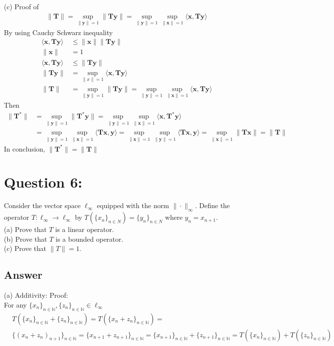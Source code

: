 \documentclass[a4paper,12pt]{article}
\newcommand{\N}{\mathbb{N}}
\begin{document}
\vspace{1cm}
\noindent
(c)
Proof of 
\begin{align*}
    \|\bm{T}\| = \sup_{\|\bm{y}\| = 1}\|\bm{T}\bm{y}\| = \sup_{\|\bm{y}\| = 1}\sup_{\|\bm{x}\| = 1}\langle \bm{x}, \bm{T}\bm{y} \rangle
\end{align*}
By using Cauchy Schwarz inequality
\begin{align*}
    \langle \bm{x}, \bm{T}\bm{y} \rangle &\leq \|\bm{x}\|\|\bm{T}\bm{y}\| \\
    \|\bm{x}\| &= 1 \\
    \langle \bm{x}, \bm{T}\bm{y} \rangle &\leq \|\bm{T}\bm{y}\| \\
    \|\bm{T}\bm{y}\| &= \sup_{\|x\| = 1} \langle \bm{x}, \bm{T}\bm{y} \rangle \\
    \|\bm{T}\| &= \sup_{\|\bm{y}\| = 1}\|\bm{T}\bm{y}\| = \sup_{\|\bm{y}\| = 1}\sup_{\|\bm{x}\| = 1}\langle \bm{x}, \bm{T}\bm{y} \rangle
\end{align*}
Then
\begin{align*}
    \|\bm{T}^*\| &= \sup_{\|\bm{y}\|=1} \|\bm{T}^* \bm{y}\| = \sup_{\|\bm{y}\|=1}  \sup_{\|\bm{x}\|=1}\langle \bm{x}, \bm{T}^*\bm{y}\rangle \\
    &= \sup_{\|\bm{y}\| = 1} \sup_{ \|\bm{x}\| = 1} \langle \bm{T}\bm{x}, \bm{y} \rangle = \sup_{\|\bm{x}\| = 1} \sup_{ \|\bm{y}\| = 1} \langle \bm{T}\bm{x}, \bm{y} \rangle = \sup_{\|\bm{x}\|=1}\|\bm{T}\bm{x}\| = \|\bm{T}\|
\end{align*}
In conclusion, \(\|\bm{T}^*\| = \|\bm{T}\|\)

\section*{Question 6:}
Consider the vector space \(\ell_{\infty}\) equipped with the norm \(\|\cdot\|_{\infty}\). Define the operator \(T: \ell_{\infty} \to \ell_{\infty}\) by \(T(\{x_n\}_{n \in N}) = \{y_n\}_{n\in N}\) where \(y_n = x_{n+1}\). \\
(a) Prove that \(T\) is a linear operator. \\
(b) Prove that \(T\) is a bounded operator. \\
(c) Prove that \(\|T\|=1\).

\subsection*{Answer}
(a) Additivity: Proof: \\
For any \(\{x_n\}_{n \in \N} , \{z_n\}_{n \in \N} \in \ell_\infty\)
\begin{align*}
    &T(\{x_n\}_{n\in\N} + \{z_n\}_{n\in\N}) = T(\{x_n + z_n\}_{n\in\N}) = \\
    &\{(x_n + z_n)_{n+1}\}_{n\in\N} = \{x_{n+1} + z_{n+1}\}_{n\in\N} = \{x_{n+1}\}_{n\in\N} + \{z_{n+1}\}_{n\in\N} = T(\{x_n\}_{n\in\N}) + T(\{z_n\}_{n\in\N})
\end{align*}
\end{document}
